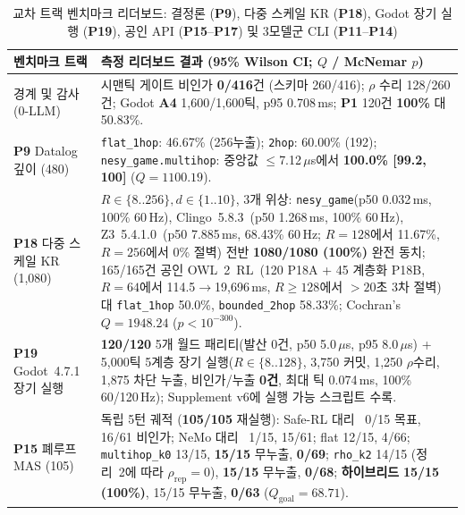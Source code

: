 \begin{table}[!tbp]
\caption{교차 트랙 벤치마크 리더보드: 결정론 (\textbf{P9}), 다중 스케일 KR (\textbf{P18}), Godot 장기 실행 (\textbf{P19}), 공인 API (\textbf{P15}--\textbf{P17}) 및 3모델군 CLI (\textbf{P11}--\textbf{P14})}
\label{tab:phase4-compact}
\centering
\scriptsize
\setlength{\tabcolsep}{2.5pt}
\begin{tabularx}{\columnwidth}{@{}>{\raggedright\arraybackslash}p{}>{\raggedright\arraybackslash}X@{}}
\toprule
\textbf{벤치마크 트랙} & \textbf{측정 리더보드 결과 (95\% Wilson CI; $Q$ / McNemar $p$)} \\
\midrule
경계 및 감사 (0-LLM) & 시맨틱 게이트 비인가 \textbf{0/416}건 (스키마 260/416); $\rho$ 수리 128/260건; Godot \textbf{A4} 1,600/1,600틱, p95 0.708\,ms; \textbf{P1} 120건 \textbf{100\%} 대 50.83\%. \\
\textbf{P9} Datalog 깊이 (480) & \texttt{flat\_1hop}: 46.67\% (256누출); \texttt{2hop}: 60.00\% (192); \texttt{nesy\_game.multihop}: 중앙값 $\le$7.12\,$\mu$s에서 \textbf{100.0\% [99.2, 100]} ($Q{=}1100.19$). \\
\textbf{P18} 다중 스케일 KR (1,080) & $R{\in}\{8..256\}, d{\in}\{1..10\}$, 3개 위상: \texttt{nesy\_game}(p50 0.032\,ms, 100\% 60\,Hz), Clingo~5.8.3~\cite{gebser2019clingo}(p50 1.268\,ms, 100\% 60\,Hz), Z3~5.4.1.0~\cite{demoura2008z3}(p50 7.885\,ms, 68.43\% 60\,Hz; $R{=}128$에서 11.67\%, $R{=}256$에서 0\% 절벽) 전반 \textbf{1080/1080 (100\%)} 완전 동치; 165/165건 공인 OWL~2~RL~\cite{motik2012owl2profiles}(120 P18A + 45 계층화 P18B, $R{=}64$에서 114.5$\to$19,696\,ms, $R{\ge}128$에서 $>20$초 3차 절벽) 대 \texttt{flat\_1hop} 50.0\%, \texttt{bounded\_2hop} 58.33\%; Cochran's $Q{=}1948.24$ ($p < 10^{-300}$). \\
\textbf{P19} Godot~4.7.1 장기 실행 & \textbf{120/120} 5개 월드 패리티(발산 0건, p50 5.0\,$\mu$s, p95 8.0\,$\mu$s) + 5,000틱 5계층 장기 실행($R{\in}\{8..128\}$, 3,750 커밋, 1,250 $\rho$수리, 1,875 차단 누출, 비인가/누출 \textbf{0건}, 최대 틱 0.074\,ms, 100\% 60/120\,Hz); Supplement v6에 실행 가능 스크립트 수록. \\
\textbf{P15} 폐루프 MAS (105) & 독립 5턴 궤적 (\textbf{105/105} 재실행): Safe-RL 대리~\cite{alshiekh2018shield} 0/15 목표, 16/61 비인가; NeMo 대리~\cite{rebedea2023nemo} 1/15, 15/61; flat 12/15, 4/66; \texttt{multihop\_k0} 13/15, \textbf{15/15} 무누출, \textbf{0/69}; \texttt{rho\_k2} 14/15 (정리~2에 따라 $\rho_{\mathrm{rep}}{=}0$), \textbf{15/15} 무누출, \textbf{0/68}; \textbf{하이브리드} \textbf{15/15 (100\%)}, 15/15 무누출, \textbf{0/63} ($Q_{\mathrm{goal}}{=}68.71$). \\

\end{tabularx}
\end{table}
